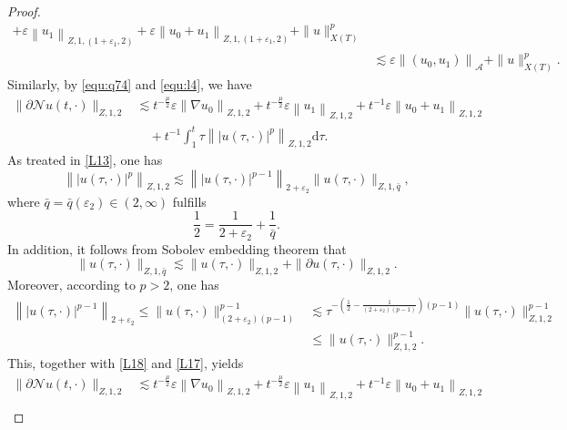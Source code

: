 \documentclass[11pt,twoside]{article}
\newcommand{\p}{\partial}
\newcommand{\ve}{\varepsilon}
\newcommand{\f}{\frac}
\theoremstyle{plain}
\theoremstyle{definition}
\theoremstyle{remark}
\numberwithin{equation}{section}
\begin{document}
\begin{proof}
\begin{equation}
\begin{aligned}
+\ve\left\|u_1\right\|_{Z, 1,(1+\varepsilon_1, 2)}+\ve\left\|u_0+u_1\right\|_{Z, 1,(1+\varepsilon_1, 2)}+ \|u\|_{X(T)}^p\\
& \lesssim \ve\left\|\left(u_{0}, u_{1}\right)\right\|_{\mathcal{A}}+ \|u\|_{X(T)}^p.
\end{aligned}
\end{equation}
Similarly, by \eqref{equ:q74} and \eqref{equ:l4}, we have
\begin{equation}\label{L16}
\begin{aligned}
\|\p\mathcal{N}u(t, \cdot)\|_{Z, 1, 2} &\lesssim t^{-\f{\mu}{2}}\ve\left\|\nabla u_0\right\|_{Z, 1, 2}
+t^{-\f{\mu}{2}}\ve\left\| u_1\right\|_{Z, 1, 2}+t^{-1}\ve\left\|u_0+u_1\right\|_{Z, 1,2}\\
&\quad+ t^{-1}\int_{1}^{t} \tau\left\||u(\tau, \cdot)|^p\right\|_{Z, 1,2}\mathrm{d}\tau.
\end{aligned}
\end{equation}
As treated in \eqref{L13}, one has
\begin{equation}\label{L17}
\left\||u(\tau, \cdot)|^p\right\|_{Z, 1,2} \lesssim\left\||u(\tau, \cdot)|^{p-1}\right\|_{2+\varepsilon_2}\|u(\tau, \cdot)\|_{Z, 1, \bar{q}},
\end{equation}
where $\bar{q}=\bar{q}(\varepsilon_2)\in(2, \infty)$ fulfills
\begin{equation}\label{L17-1}
\f{1}{2}=\f{1}{2+\varepsilon_2}+\f{1}{\bar{q}}.
\end{equation}
In addition, it follows from Sobolev embedding theorem that
\begin{equation}\label{L18}
\|u(\tau, \cdot)\|_{Z, 1, \bar{q}} \lesssim\|u(\tau, \cdot)\|_{Z, 1,2}+\|\p u(\tau, \cdot)\|_{Z, 1,2} .
\end{equation}
Moreover, according to $p>2$, one has
$$
\begin{aligned}
\left\||u(\tau, \cdot)|^{p-1}\right\|_{2+\varepsilon_2}  \leq\|u(\tau, \cdot)\|_{\left(2+\varepsilon_2\right)(p-1)}^{p-1} &\lesssim\tau^{-\left(\frac{1}{2}-\frac{1}{\left(2+\varepsilon_2\right)(p-1)}\right)(p-1)}\|u(\tau, \cdot)\|_{Z, 1,2}^{p-1} \\
& \leq\|u(\tau, \cdot)\|_{Z, 1,2}^{p-1}.
\end{aligned}
$$
This, together with \eqref{L18} and \eqref{L17}, yields
$$
\begin{aligned}
\|\p \mathcal{N}u(t, \cdot)\|_{Z, 1, 2} &\lesssim t^{-\f{\mu}{2}}\ve\left\|\nabla u_0\right\|_{Z, 1, 2}
+t^{-\f{\mu}{2}}\ve\left\|u_1\right\|_{Z, 1, 2}+t^{-1}\ve\left\|u_0+u_1\right\|_{Z, 1,2}\\

\end{aligned}$$
\end{proof}
\end{document}
